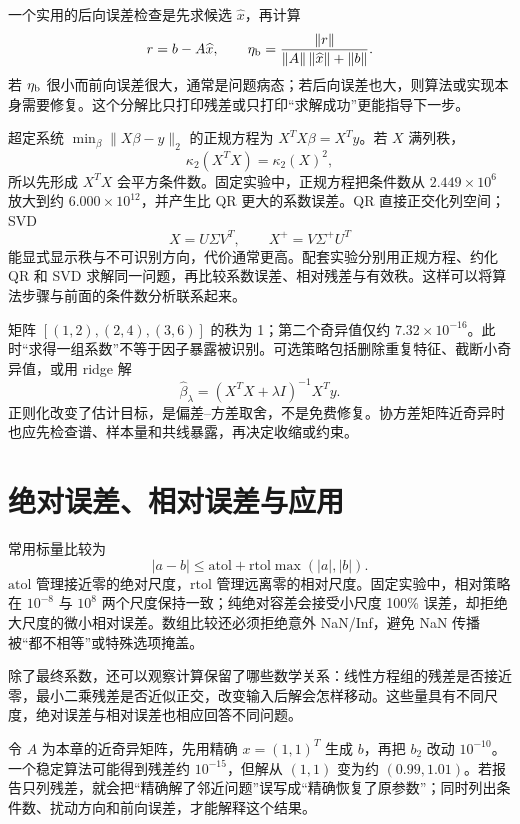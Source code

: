一个实用的后向误差检查是先求候选 $\widehat x$，再计算
\[
 r=b-A\widehat x,\qquad
 \eta_{\rm b}=\frac{\|r\|}{\|A\|\,\|\widehat x\|+\|b\|}.
\]
若 $\eta_{\rm b}$ 很小而前向误差很大，通常是问题病态；若后向误差也大，则算法或实现本身需要修复。这个分解比只打印残差或只打印“求解成功”更能指导下一步。


超定系统 $\min_\beta\|X\beta-y\|_2$ 的正规方程为 $X^TX\beta=X^Ty$。若 $X$ 满列秩，
\[
  \kappa_2(X^TX)=\kappa_2(X)^2,
\]
所以先形成 $X^TX$ 会平方条件数。固定实验中，正规方程把条件数从 $2.449\times10^6$ 放大到约 $6.000\times10^{12}$，并产生比 QR 更大的系数误差。QR 直接正交化列空间；SVD
\[
  X=U\Sigma V^T,
  \qquad X^+=V\Sigma^+U^T
\]
能显式显示秩与不可识别方向，代价通常更高。配套实验分别用正规方程、约化 QR 和 SVD 求解同一问题，再比较系数误差、相对残差与有效秩。这样可以将算法步骤与前面的条件数分析联系起来。

矩阵 $[(1,2),(2,4),(3,6)]$ 的秩为 1；第二个奇异值仅约 $7.32\times10^{-16}$。此时“求得一组系数”不等于因子暴露被识别。可选策略包括删除重复特征、截断小奇异值，或用 ridge 解
\[
  \widehat\beta_\lambda=(X^TX+\lambda I)^{-1}X^Ty.
\]
正则化改变了估计目标，是偏差--方差取舍，不是免费修复。协方差矩阵近奇异时也应先检查谱、样本量和共线暴露，再决定收缩或约束。

\section{绝对误差、相对误差与应用}

常用标量比较为
\[
 |a-b|\le \mathrm{atol}+\mathrm{rtol}\max(|a|,|b|).
\]
$\mathrm{atol}$ 管理接近零的绝对尺度，$\mathrm{rtol}$ 管理远离零的相对尺度。固定实验中，相对策略在 $10^{-8}$ 与 $10^8$ 两个尺度保持一致；纯绝对容差会接受小尺度 100\% 误差，却拒绝大尺度的微小相对误差。数组比较还必须拒绝意外 NaN/Inf，避免 NaN 传播被“都不相等”或特殊选项掩盖。

除了最终系数，还可以观察计算保留了哪些数学关系：线性方程组的残差是否接近零，最小二乘残差是否近似正交，改变输入后解会怎样移动。这些量具有不同尺度，绝对误差与相对误差也相应回答不同问题。

\begin{example}[残差小而答案错]
令 $A$ 为本章的近奇异矩阵，先用精确 $x=(1,1)^T$ 生成 $b$，再把 $b_2$ 改动 $10^{-10}$。一个稳定算法可能得到残差约 $10^{-15}$，但解从 $(1,1)$ 变为约 $(0.99,1.01)$。若报告只列残差，就会把“精确解了邻近问题”误写成“精确恢复了原参数”；同时列出条件数、扰动方向和前向误差，才能解释这个结果。
\end{example}

